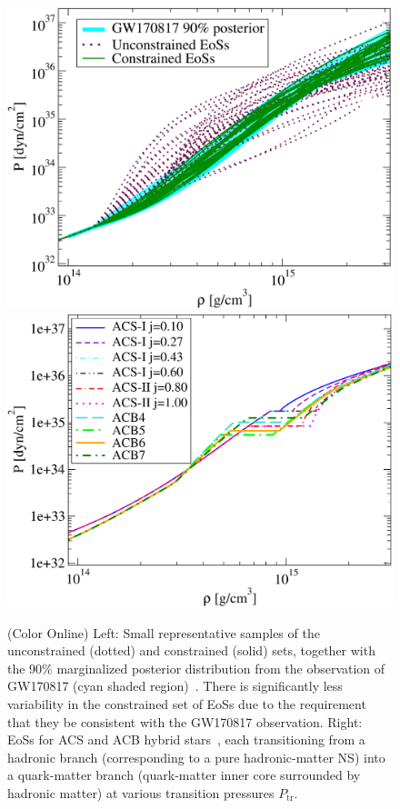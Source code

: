 \documentclass[prd,twocolumn,nofootinbib,superscriptaddress,amsmath,amssymb]{revtex4-1}
\begin{document}
\begin{figure}
\begin{center} 
\includegraphics[width=.97\columnwidth]{EoSs.pdf}
\includegraphics[width=\columnwidth]{hybridEoSs.pdf}
\end{center}
\caption{(Color Online) Left: Small representative samples of the unconstrained (dotted) and constrained (solid) sets, together with the 90\% marginalized posterior distribution from the observation of GW170817 (cyan shaded region)~\cite{LIGO:posterior}. There is significantly less variability in the constrained set of EoSs due to the requirement that they be consistent with the GW170817 observation. Right: EoSs for ACS and ACB hybrid stars~\cite{Paschalidis2018}, each transitioning from a hadronic branch (corresponding to a pure hadronic-matter NS) into a quark-matter branch (quark-matter inner core surrounded by hadronic matter) at various transition pressures $P_{\text{tr}}$.
}
\label{fig:eos}
\end{figure} 
\end{document}
